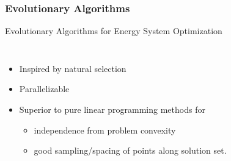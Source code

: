 \begin{frame}
    \frametitle{Evolutionary Algorithms}

    \begin{block}{Evolutionary Algorithms for Energy System Optimization}
        \begin{columns}
            \column[t]{6cm}
            \begin{itemize}
            \item Inspired by natural selection
            \item Parallelizable
            \item Superior to pure linear programming methods for
                \begin{itemize}
                    \item independence from problem convexity
                    \item good sampling/spacing of points along solution set.
                \end{itemize}
            \end{itemize}
            

\end{columns}
\end{block}
\end{frame}

